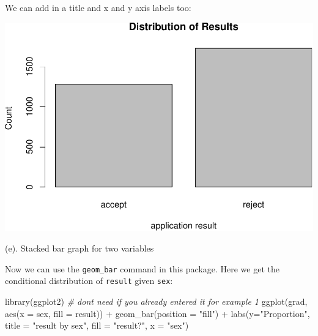 \documentclass[
]{book}
\newenvironment{Shaded}{\begin{snugshade}}{\end{snugshade}}
\newcommand{\AttributeTok}[1]{\textcolor[rgb]{0.77,0.63,0.00}{#1}}
\newcommand{\CommentTok}[1]{\textcolor[rgb]{0.56,0.35,0.01}{\textit{#1}}}
\newcommand{\FunctionTok}[1]{\textcolor[rgb]{0.00,0.00,0.00}{#1}}
\newcommand{\NormalTok}[1]{#1}
\newcommand{\SpecialCharTok}[1]{\textcolor[rgb]{0.00,0.00,0.00}{#1}}
\newcommand{\StringTok}[1]{\textcolor[rgb]{0.31,0.60,0.02}{#1}}
\begin{document}
We can add in a title and x and y axis labels too:

\begin{Shaded}
\end{Shaded}

\includegraphics[width=1\linewidth]{Class_Activity_4_files/figure-latex/unnamed-chunk-24-1}

(e). Stacked bar graph for two variables

Now we can use the \texttt{geom\_bar} command in this package. Here we get the conditional distribution of \texttt{result} given \texttt{sex}:

\begin{Shaded}
\begin{Highlighting}[]
\FunctionTok{library}\NormalTok{(ggplot2) }\CommentTok{\# don\textquotesingle{}t need if you already entered it for example 1}
\FunctionTok{ggplot}\NormalTok{(grad, }\FunctionTok{aes}\NormalTok{(}\AttributeTok{x =}\NormalTok{ sex, }\AttributeTok{fill =}\NormalTok{ result)) }\SpecialCharTok{+} 
  \FunctionTok{geom\_bar}\NormalTok{(}\AttributeTok{position =} \StringTok{"fill"}\NormalTok{) }\SpecialCharTok{+} 
  \FunctionTok{labs}\NormalTok{(}\AttributeTok{y=}\StringTok{"Proportion"}\NormalTok{, }\AttributeTok{title =} \StringTok{"result by sex"}\NormalTok{, }\AttributeTok{fill =} \StringTok{"result?"}\NormalTok{, }\AttributeTok{x =} \StringTok{"sex"}\NormalTok{)}
\end{Highlighting}
\end{Shaded}
\end{document}
